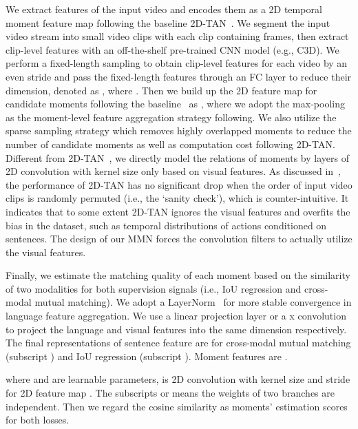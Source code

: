 \documentclass[letterpaper]{article} \usepackage{aaai22}  \usepackage{times}  \usepackage{helvet}  \usepackage{courier}  \usepackage[hyphens]{url}  \usepackage{graphicx} \urlstyle{rm} \def\UrlFont{\rm}  \usepackage{natbib}  \usepackage{caption} \DeclareCaptionStyle{ruled}{labelfont=normalfont,labelsep=colon,strut=off} \frenchspacing  \setlength{\pdfpagewidth}{8.5in}  \setlength{\pdfpageheight}{11in}  \usepackage{algorithm}
\begin{document}
 We extract features of the input video and encodes them as a 2D temporal moment feature map following the baseline 2D-TAN~\cite{DBLP:conf/aaai/ZhangPFL20}. We segment the input video stream into small video clips  with each clip  containing  frames, then extract clip-level features with an off-the-shelf pre-trained CNN model (e.g., C3D). We perform a fixed-length sampling to obtain  clip-level features for each video by an even stride  and pass the fixed-length features through an FC layer to reduce their dimension, denoted as , where . Then we build up the 2D feature map for candidate moments following the baseline~\cite{DBLP:conf/aaai/ZhangPFL20} as , where we adopt the max-pooling as the moment-level feature aggregation strategy following. We also utilize the sparse sampling strategy which removes highly overlapped moments to reduce the number of candidate moments as well as computation cost following 2D-TAN. Different from 2D-TAN~\cite{DBLP:conf/aaai/ZhangPFL20}, we directly model the relations of moments  by  layers of 2D convolution with kernel size  only based on visual features. As discussed in~\cite{DBLP:conf/bmvc/OtaniNRH20}, the performance of 2D-TAN has no significant drop when the order of input video clips is randomly permuted (i.e., the `sanity check'), which is counter-intuitive. It indicates that to some extent 2D-TAN ignores the visual features and overfits the bias in the dataset, such as temporal distributions of actions conditioned on sentences. The design of our MMN forces the convolution filters to actually utilize the visual features. 

 Finally, we estimate the matching quality of each moment based on the similarity of two modalities for both supervision signals (i.e., IoU regression and cross-modal mutual matching). We adopt a LayerNorm~\cite{DBLP:journals/corr/BaKH16} for more stable convergence in language feature aggregation. We use a linear projection layer or a x convolution to project the language and visual features into the same dimension  respectively. The final representations of sentence feature are  for cross-modal mutual matching (subscript ) and IoU regression (subscript ). Moment features are . 



where  and  are learnable parameters,  is 2D convolution with kernel size  and stride  for 2D feature map . The subscripts  or  means the weights of two branches are independent. Then we regard the cosine similarity as moments' estimation scores for both losses. 
\end{document}
